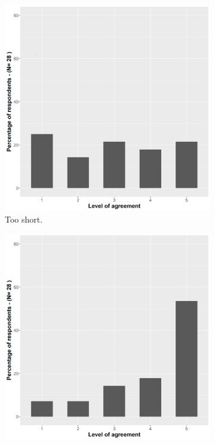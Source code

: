 \begin{figure}[tbp]
\centering
  \begin{subfigure}[t]{0.49\columnwidth}
  \centering
    \includegraphics[width=\linewidth]{images/06-deception/dynamicTooShortYoung}
    \caption{Too short.} 
    \label{fig::dynamictooShortYoung}
  \end{subfigure}
  \hspace{0.01\columnwidth}
  \begin{subfigure}[t]{0.49\columnwidth}
  \centering
    \includegraphics[width=\linewidth]{images/06-deception/dynamicWinYoung}

\end{subfigure}
\end{figure}
